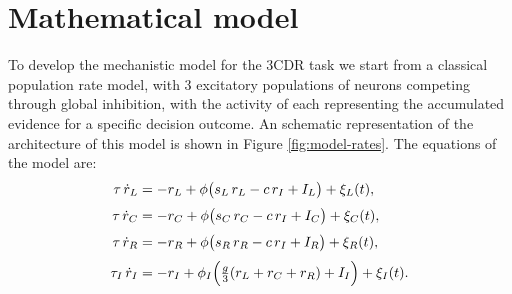 \documentclass[12,twoside]{TFG-GM}
\theoremstyle{definition}
\theoremstyle{remark}
\begin{document}
\newpage
\section{Mathematical model}
To develop the mechanistic model for the 3CDR task we start from a classical population rate model, with 3 excitatory populations of neurons competing through global inhibition, with the activity of each representing the accumulated evidence for a specific decision outcome. An schematic representation of the architecture of this model is shown in Figure \ref{fig:model-rates}. The equations of the model are:
\begin{subequations}
\label{eq:rates}
\begin{align}
  \tau\,\dot{r}_L &= -r_L + \phi\bigl(s_L\,r_L - c\,r_I + I_L \bigr) + \xi_L(t) ,  \label{eq:rL}\\[1mm]
  \tau\,\dot{r}_C &= -r_C + \phi\bigl(s_C\,r_C - c\,r_I + I_C \bigr) + \xi_C(t), \label{eq:rC}\\[1mm]
  \tau\,\dot{r}_R &= -r_R + \phi\bigl(s_R\,r_R - c\,r_I + I_R \bigr) + \xi_R(t), 
  \label{eq:rR}\\[1mm]
  \tau_I\,\dot{r}_I &= -r_I + \phi_I\Bigl(\tfrac{g}{3}(r_L+r_C+r_R) + I_I\Bigr) + \xi_I(t). \label{eq:rI}
\end{align}
\end{subequations}
\end{document}
